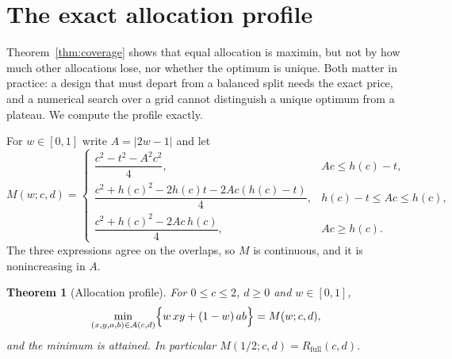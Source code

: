 \documentclass[11pt]{article}
\newtheorem{theorem}{Theorem}[section]
\theoremstyle{definition}
\theoremstyle{remark}
\newcommand{\Rfull}{R_{\mathrm{full}}}
\newcommand{\hc}{h(c)}
\begin{document}
\section{The exact allocation profile}\label{sec:profile}

Theorem~\ref{thm:coverage} shows that equal allocation is maximin, but not by
how much other allocations lose, nor whether the optimum is unique. Both matter
in practice: a design that must depart from a balanced split needs the exact
price, and a numerical search over a grid cannot distinguish a unique optimum
from a plateau. We compute the profile exactly.

For $w\in[0,1]$ write $A=|2w-1|$ and let
\begin{equation}\label{eq:profile}
M(w;c,d)=
\begin{cases}
\dfrac{c^2-t^2-A^2c^2}{4}, & Ac\le \hc-t,\\[8pt]
\dfrac{c^2+\hc^2-2\hc t-2Ac(\hc-t)}{4}, & \hc-t\le Ac\le \hc,\\[8pt]
\dfrac{c^2+\hc^2-2Ac\,\hc}{4}, & Ac\ge \hc.
\end{cases}
\end{equation}
The three expressions agree on the overlaps, so $M$ is continuous, and it is
nonincreasing in $A$.

\begin{theorem}[Allocation profile]\label{thm:profile}
For $0\le c\le2$, $d\ge0$ and $w\in[0,1]$,
\[
\min_{(x,y,a,b)\in\mathcal A(c,d)}\Bigl\{w\,xy+(1-w)\,ab\Bigr\}=M(w;c,d),
\]
and the minimum is attained. In particular $M(1/2;c,d)=\Rfull(c,d)$.
\end{theorem}
\end{document}

